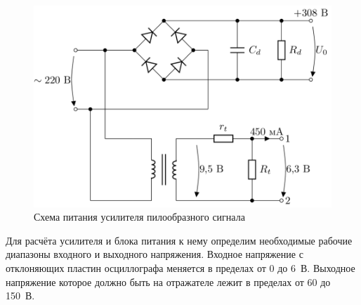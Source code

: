 \documentclass[a4paper,14pt]{extarticle}
\begin{document}
    \begin{figure}[!h]
    	\begin{center}
    		\includegraphics[width=.5\textwidth]{images/amplifier_.png}
    	\end{center}
    	\caption{Схема питания усилителя пилообразного сигнала}
    	\label{figcasc_}
    \end{figure}
    
    Для расчёта усилителя и блока питания к нему определим необходимые рабочие диапазоны входного и выходного напряжения. Входное напряжение с отклоняющих пластин осциллографа меняется в пределах от 0 до 6~В. Выходное напряжение которое должно быть на отражателе лежит в пределах от 60 до 150~В. 
    
\end{document}
